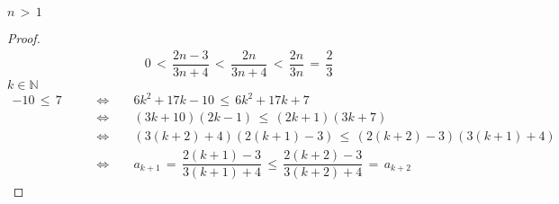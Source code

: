 \begin{exercise}
 $n \hspace{2pt} > \hspace{2pt} 1$ \\[1ex]
\begin{proof}
    \begin{align*}
        &0 \hspace{2pt} < \hspace{2pt} \dfrac{2n - 3}{3n + 4} \hspace{2pt} < \hspace{2pt} \dfrac{2n}{3n + 4} \hspace{2pt} < \hspace{2pt} \dfrac{2n}{3n} \hspace{2pt} = \hspace{2pt} \dfrac{2}{3}
    \end{align*}
     $k \in \mathbb{N}$
    \begin{align*}
        -10 \hspace{2pt} \leq \hspace{2pt} 7 \hspace{20pt} &\Longleftrightarrow \hspace{20pt} 6k^{2} + 17k - 10 \hspace{2pt} \leq \hspace{2pt} 6k^{2} + 17k + 7 \\[1ex]
        &\Longleftrightarrow \hspace{20pt} (3k + 10)(2k - 1) \hspace{2pt} \leq \hspace{2pt} (2k + 1)(3k + 7) \\[1ex]
        &\Longleftrightarrow \hspace{20pt} (3(k + 2) + 4)(2(k + 1) - 3) \hspace{2pt} \leq \hspace{2pt} (2(k + 2) - 3)(3(k + 1) + 4) \\[1ex]
        &\Longleftrightarrow \hspace{20pt} a_{k + 1} \hspace{2pt} = \hspace{2pt} \dfrac{2(k + 1) - 3}{3(k + 1) + 4} \hspace{2pt} \leq \hspace{2pt} \dfrac{2(k + 2) - 3}{3(k + 2) + 4} \hspace{2pt} = \hspace{2pt} a_{k + 2}
    \end{align*}
\end{proof}
\end{exercise}

